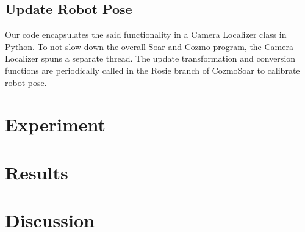 \documentclass[jou,apacite]{apa6}
\begin{document}
\subsection{Update Robot Pose}
Our code encapsulates the said functionality in a Camera Localizer class in Python. To not slow down the overall Soar and Cozmo program, the Camera Localizer spuns a separate thread. The update transformation and conversion functions are periodically called in the Rosie branch of CozmoSoar to calibrate robot pose. 

\section{Experiment}


\section{Results}


\section{Discussion}



\end{document}
